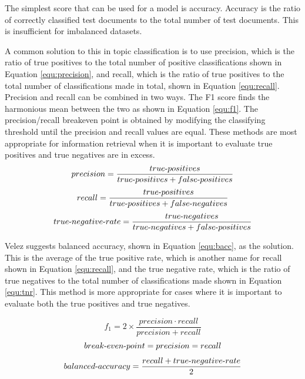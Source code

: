 			The simplest score that can be used for a model is accuracy. Accuracy is the ratio of correctly classified test documents to the total number of test documents. This is insufficient for imbalanced datasets\cite{balanced_accuracy_velez}.
			
			A common solution to this in topic classification is to use precision, which is the ratio of true positives to the total number of positive classifications shown in Equation \ref{equ:precision}, and recall, which is the ratio of true positives to the total number of classifications made in total, shown in Equation \ref{equ:recall}. Precision and recall can be combined in two ways. The F1 score finds the harmonious mean between the two as shown in Equation \ref{equ:f1}. The precision/recall breakeven point is obtained by modifying the classifying threshold until the precision and recall values are equal\cite{ml_automated_sebastiani}. These methods are most appropriate for information retrieval when it is important to evaluate true positives and true negatives are in excess\cite{markedness_correlation_powers}.
			\begin{equation}\label{equ:precision}
				precision = \frac{true\textnormal{-}positives}{true\textnormal{-}positives + false\textnormal{-}positives}
			\end{equation}
			\begin{equation}\label{equ:recall}
				recall = \frac{true\textnormal{-}positives}{true\textnormal{-}positives + false\textnormal{-}negatives}
			\end{equation}
			\begin{equation}\label{equ:tnr}
				true\textnormal{-}negative\textnormal{-}rate = \frac{true\textnormal{-}negatives}{true\textnormal{-}negatives + false\textnormal{-}positives}
			\end{equation}

			Velez suggests balanced accuracy, shown in Equation \ref{equ:bacc}, as the solution. This is the average of the true positive rate, which is another name for recall shown in Equation \ref{equ:recall}, and the true negative rate, which is the ratio of true negatives to the total number of classifications made shown in Equation \ref{equ:tnr}. This method is more appropriate for cases where it is important to evaluate both the true positives and true negatives.

			\begin{equation}\label{equ:f1}
				f_1 = 2 \times \frac{precision \cdot recall}{precision + recall}
			\end{equation}
			\begin{equation}\label{equ:bep}
				break\textnormal{-}even\textnormal{-}point = precision = recall
			\end{equation}
			\begin{equation}\label{equ:bacc}
				balanced\textnormal{-}accuracy = \frac{recall + true\textnormal{-}negative\textnormal{-}rate}{2}
			\end{equation}

